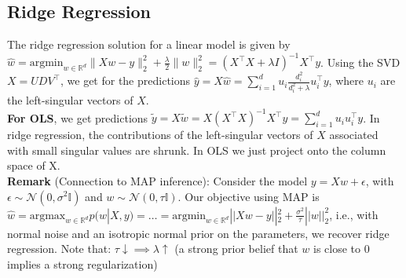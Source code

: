 \subsection{Ridge Regression}
The ridge regression solution for a linear model is given by \\
$\hat{w} = \text{argmin}_{\scriptscriptstyle w \in \mathbb{R}^d} \|Xw - y\|_2^2 + \frac{\lambda}{2} \|w\|_2^2 = (X^\intercal X + \lambda I)^{-1} X^\intercal y$. Using the SVD $X = UDV^\intercal$, we get for the predictions $\hat{y}=X\hat{w}=\sum_{i=1}^d u_i \frac{d_i^2}{d_i^2+\lambda}u_i^\intercal y$, where $u_i$ are the left-singular vectors of $X$. \\
\textbf{For OLS}, we get predictions $\tilde{y} = X\tilde{w}=X(X^\intercal X)^{-1}X^\intercal y = \sum_{i=1}^d u_iu_i^\intercal y$.
\textrightarrow In ridge regression, the contributions of the left-singular vectors of $X$ associated with small singular values are shrunk. In OLS we just project onto the column space of X. \\
\textbf{Remark} (Connection to MAP inference): Consider the model $y = Xw + \epsilon$, with $\epsilon \sim \mathcal{N}(0, \sigma^2 \mathbb{I})$ and $w \sim \mathcal{N}(0, \tau \mathbb{I})$. Our objective using MAP is $\hat{w}=\text{argmax}_{w\in\mathbb{R}^d} p(w|X,y) = \dots = \text{argmin}_{w\in\mathbb{R}^d}||Xw-y||_2^2+\frac{\sigma^2}{\tau}||w||^2_2$, i.e., with normal noise and an isotropic normal prior on the parameters, we recover ridge regression. Note that: $\tau \downarrow \implies \lambda \uparrow$ (a strong prior belief that $w$ is close to $0$ implies a strong regularization)

